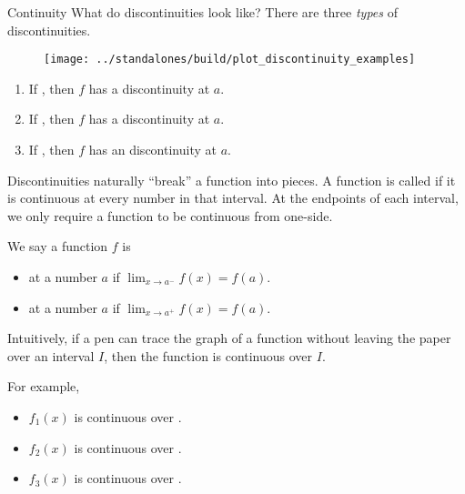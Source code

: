 \documentclass[../main.tex]{subfiles}
\begin{document}
\begin{lesson}{Continuity}
  What do discontinuities look like? There are three \emph{types} of discontinuities.

  \begin{figure}[h]  %
    \centering
    \texttt{[image: ../standalones/build/plot\_discontinuity\_examples]}
    \label{fig:discontinuities}
  \end{figure}

  \begin{enumerate}[itemsep={3ex}]
    \item If \underline{\hspace{3in}}, then \(f\) has a  discontinuity at \(a\).
    \item If \underline{\hspace{3in}}, then \(f\) has a  discontinuity at \(a\).
    \item If \underline{\hspace{3in}}, then \(f\) has an  discontinuity at \(a\).
  \end{enumerate}

  Discontinuities naturally ``break'' a function into pieces.
  A function is called  if it is continuous at every number in that interval. At the endpoints of each interval, we only require a function to be continuous from one-side.

  We say a function \(f\) is 
  \begin{itemize}
    \item {} at a number \(a\) if \(\lim_{{x \to a^{-}}} f(x) = f(a)\).
    \item {} at a number \(a\) if \(\lim_{{x \to a^{+}}} f(x) = f(a)\).
  \end{itemize}

  Intuitively, if a pen can trace the graph of a function without leaving the paper over an interval \(I\), then the function is continuous over \(I\).

  For example, 
  \begin{itemize}[itemsep={3ex}]
    \item \(f_{1}(x)\) is continuous over \underline{\hspace{2in}}.
    \item \(f_{2}(x)\) is continuous over \underline{\hspace{2in}}.
    \item \(f_{3}(x)\) is continuous over \underline{\hspace{2in}}.
  \end{itemize}
  \vfill{}
  \clearpage


\end{lesson}
\end{document}

